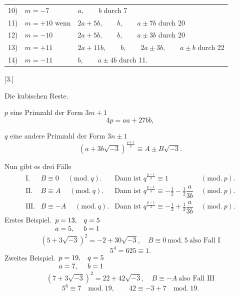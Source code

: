 \begin{center}\small\setlength{\tabcolsep}{3pt}\begin{tabular}{@{}rll@{}}
10)&$m=-7$&$a,\qquad b$ durch 7\\
11)&$m=+10$ wenn&$2a+5b,\qquad b,\qquad a\pm7b$ durch 20\\
12)&$m=-10$&$2a+5b,\qquad b,\qquad a\pm3b$ durch 20\\
13)&$m=+11$&$2a+11b,\qquad b,\qquad2a\pm3b,\qquad a\pm b$ durch 22\\
14)&$m=-11$&$b,\qquad a\pm4b$ durch 11.
\end{tabular}\end{center}
\begin{center}[3.]\par\smallskip Die kubischen Reste.\end{center}
\noindent\hspace*{\parindent}$p$ eine Primzahl der Form $3m+1$
\[4p=aa+27bb,\]
\par\noindent\hspace*{\parindent}$q$ eine andere Primzahl der Form $3n\pm1$
\[(a+3b\sqrt{-3})^{\frac{q\mp1}{3}}\equiv A\pm B\sqrt{-3}.\]
\par\noindent\hspace*{\parindent}Nun gibt es drei Fälle
\[\begin{array}{rlll}
\text{I.}&B\equiv0\quad\;(\mathrm{mod.}\ q).&\text{Dann ist }q^{\frac{p-1}{3}}\equiv1&\;(\mathrm{mod.}\ p).\\[5pt]
\text{II.}&B\equiv A\quad\;(\mathrm{mod.}\ q).&\text{Dann ist }q^{\frac{p-1}{3}}\equiv-\tfrac12-\tfrac12\dfrac{a}{3b}&\;(\mathrm{mod.}\ p).\\[5pt]
\text{III.}&B\equiv-A\quad\;(\mathrm{mod.}\ q).&\text{Dann ist }q^{\frac{p-1}{3}}\equiv-\tfrac12+\tfrac12\dfrac{a}{3b}&\;(\mathrm{mod.}\ p).
\end{array}\]
\noindent\hspace*{\parindent}Erstes Beispiel.\qquad $\begin{array}[t]{ll}p=13,&q=5\\a=5,&b=1\end{array}$
\[(5+3\sqrt{-3})^2=-2+30\sqrt{-3},\quad B\equiv0\ \mathrm{mod.}\ 5\ \text{also Fall I}\]
\[5^4=625\equiv1.\]
\noindent\hspace*{\parindent}Zweites Beispiel.\qquad $\begin{array}[t]{ll}p=19,&q=5\\a=7,&b=1\end{array}$
\[(7+3\sqrt{-3})^2=22+42\sqrt{-3},\quad B\equiv-A\ \text{also Fall III}\]
\[5^6\equiv7\quad\mathrm{mod.}\ 19,\qquad42\equiv-3+7\quad\mathrm{mod.}\ 19.\]
